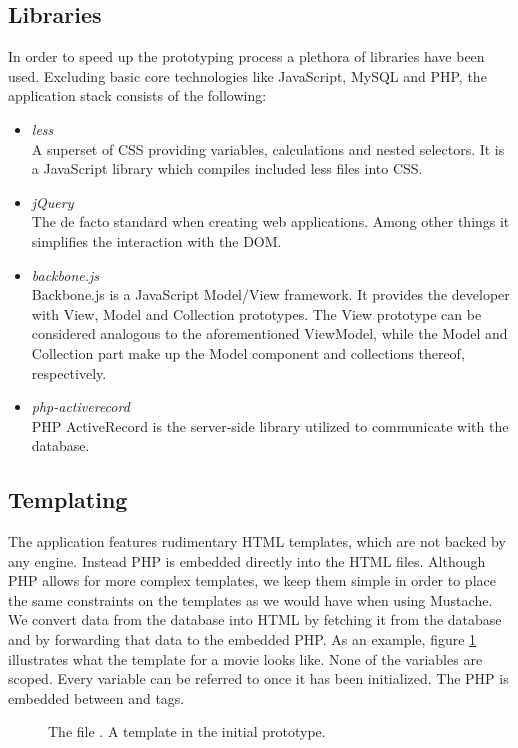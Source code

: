 \documentclass[thesis.tex]{subfiles}
\begin{document}
\subsection{Libraries}
In order to speed up the prototyping process a plethora of libraries have been
used. Excluding basic core technologies like JavaScript, MySQL and PHP, the
application stack consists of the following:
\begin{itemize}
	\item \emph{less}\\
	A superset of CSS providing variables, calculations and nested selectors. It
	is a JavaScript library which compiles included less files into CSS.
	\item \emph{jQuery}\\
	The de facto standard when creating web applications. Among other things it
	simplifies the interaction with the DOM.
	\item \emph{backbone.js}\\
	Backbone.js is a JavaScript Model/View framework. It provides the developer
	with View, Model and Collection prototypes. The View prototype can be
	considered analogous to the aforementioned ViewModel, while the Model and
	Collection part make up the Model component and collections thereof,
	respectively.
	\item \emph{php-activerecord}\\
	PHP ActiveRecord is the server-side library utilized to communicate with the
	database.
\end{itemize}

\subsection{Templating}
The application features rudimentary HTML templates, which are not backed by
any engine. Instead PHP is embedded directly into the HTML files.
Although PHP allows for more complex templates, we keep them simple in order to
place the same constraints on the templates as we would have when using
Mustache.
We convert data from the database into HTML by fetching it from the database and
by forwarding that data to the embedded PHP.
As an example, figure \ref{fig:movie.view.tpl} illustrates what the template
for a movie looks like.
None of the variables are scoped. Every variable can be referred to once it has
been initialized.
The PHP is embedded between  and  tags.

\begin{figure}
	\centering
	
	\caption{The file . A template in the initial prototype.}
	\label{fig:movie.view.tpl}
\end{figure}
\end{document}
